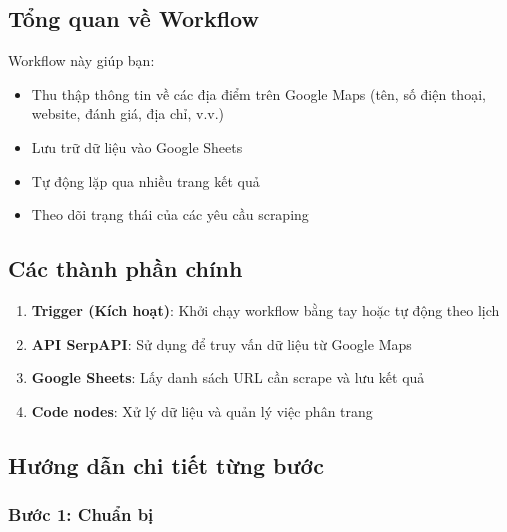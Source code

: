 \subsection{Tổng quan về Workflow}

Workflow này giúp bạn:
\begin{itemize}
  \item Thu thập thông tin về các địa điểm trên Google Maps (tên, số điện thoại, website, đánh giá, địa chỉ, v.v.)
  \item Lưu trữ dữ liệu vào Google Sheets
  \item Tự động lặp qua nhiều trang kết quả
  \item Theo dõi trạng thái của các yêu cầu scraping
\end{itemize}

\subsection{Các thành phần chính}

\begin{enumerate}
  \item \textbf{Trigger (Kích hoạt)}: Khởi chạy workflow bằng tay hoặc tự động theo lịch
  \item \textbf{API SerpAPI}: Sử dụng để truy vấn dữ liệu từ Google Maps
  \item \textbf{Google Sheets}: Lấy danh sách URL cần scrape và lưu kết quả
  \item \textbf{Code nodes}: Xử lý dữ liệu và quản lý việc phân trang
\end{enumerate}

\subsection{Hướng dẫn chi tiết từng bước}

\subsubsection{Bước 1: Chuẩn bị}

